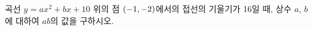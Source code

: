 곡선 $y=ax^2+bx+10$ 위의 점 $(-1{,}\mkern3mu\mathopen{}-2)$에서의 접선의 기울기가 16일 때, 상수 $a$, $b$에 대하여 $ab$의 값을 구하시오.
